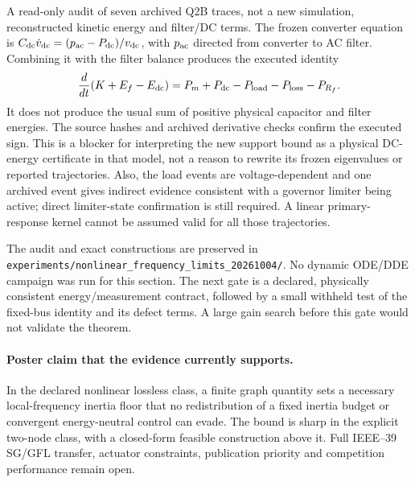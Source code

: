 \documentclass[11pt]{article}
\begin{document}
A read-only audit of seven archived Q2B traces, not a new simulation,
reconstructed kinetic energy and filter/DC terms. The frozen converter
equation is
$C_{\rm dc}\dot v_{\rm dc}=(p_{\rm ac}-P_{\rm dc})/v_{\rm dc}$,
with $p_{\rm ac}$ directed from converter to AC filter.
Combining it with the filter balance produces the executed identity
\begin{equation}
 \frac{d}{dt}(K+E_f-E_{\rm dc})
 =P_m+P_{\rm dc}-P_{\rm load}-P_{\rm loss}-P_{R_f}.
 \label{eq:nfl-executed-energy}
\end{equation}
It does not produce the usual sum of positive physical capacitor and
filter energies. The source hashes and archived derivative checks confirm
the executed sign. This is a blocker for interpreting the new support
bound as a physical DC-energy certificate in that model, not a reason to
rewrite its frozen eigenvalues or reported trajectories.
Also, the load events are voltage-dependent and one archived event gives
indirect evidence consistent with a governor limiter being active; direct
limiter-state confirmation is still required. A linear primary-response kernel cannot be
assumed valid for all those trajectories.

The audit and exact constructions are preserved in
\texttt{experiments/nonlinear\_frequency\_limits\_20261004/}.
No dynamic ODE/DDE campaign was run for this section.
The next gate is a declared, physically consistent energy/measurement
contract, followed by a small withheld test of the fixed-bus identity and
its defect terms. A large gain search before this gate would not validate
the theorem.

\paragraph{Poster claim that the evidence currently supports.}
In the declared nonlinear lossless class, a finite graph quantity sets
a necessary local-frequency inertia floor that no redistribution of a
fixed inertia budget or convergent energy-neutral control can evade.
The bound is sharp in the explicit two-node class, with a closed-form
feasible construction above it. Full IEEE--39 SG/GFL transfer, actuator
constraints, publication priority and competition performance remain open.

\end{document}
